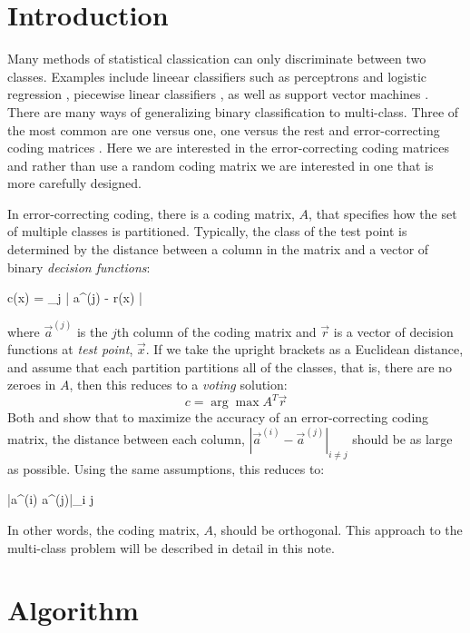 
\section{Introduction}

Many methods of statistical classication can only discriminate between two classes. 
Examples include lineear classifiers such as perceptrons and logistic regression \citep{Michie_etal1994}, 
piecewise linear classifiers \citep{Herman_Yeung1992,Mills2011},
as well as support vector machines \citep{kernel_intro}.
There are many ways of generalizing binary classification to 
multi-class.
Three of the most common are one versus one, one versus the rest and 
error-correcting coding matrices \citep{Hsu_Lin2002}.
Here we are interested in the error-correcting coding matrices
\citep{Dietterich_Bakiri1995, Windeatt_Ghaderi2002} and
rather than use a random coding matrix we are interested in one that is
more carefully designed.

In error-correcting coding, there is a coding matrix, $A$, that specifies
how the set of multiple classes is partitioned.
Typically, the class of the test point is determined by the distance between
a column in the matrix and a vector of binary {\it decision functions}:
\begin{eqnnon}
	c(\vec x) = \arg \min_j | \vec a^{(j)} - \vec r(\vec x) |
	\label{min_dist}
\end{eqnnon}
where $\vec a^{(j)}$ is the $j$th column of the coding matrix and $\vec r$
is a vector of decision functions at {\it test point}, $\vec x$.
If we take the upright brackets as a Euclidean distance, and assume that
each partition partitions all of the classes, that is, there are no zeroes
in $A$, then this reduces to a {\it voting} solution:
\begin{equation}
	c = \arg \max A^T \vec r \label{voting}
\end{equation}
Both \citet{Allwein_etal2000} and \citet{Windeatt_Ghaderi2002} show that to
maximize the accuracy of an error-correcting coding matrix, the distance
between each column, $|\vec a^{(i)} - \vec a^{(j)}|_{i \ne j}$ should be as
large as possible.
Using the same assumptions, this reduces to:
\begin{eqnnon}
	\min |\vec a^{(i)} \cdot \vec a^{(j)}|_{i \ne j}
\end{eqnnon}
In other words, the coding matrix, $A$, should be orthogonal.
This approach to the multi-class problem will be described in detail in this note.

\section{Algorithm}

